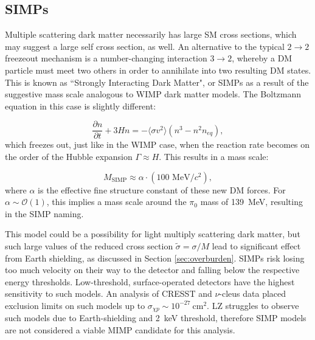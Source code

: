 \subsection{SIMPs}
\label{sec:simps}

Multiple scattering dark matter necessarily has large SM cross sections, which may suggest a large self cross section, as well.
An alternative to the typical $2\rightarrow 2$ freezeout mechanism is a number-changing interaction $3\rightarrow 2$, whereby a DM particle must meet two others in order to annihilate into two resulting DM states.
This is known as ``Strongly Interacting Dark Matter", or SIMPs\cite{bernal_wimp_2015, hochberg_simp_2022} as a result of the suggestive mass scale analogous to WIMP dark matter models.
The Boltzmann equation in this case is slightly different: 

\begin{equation}
    \frac{\partial n}{\partial t} + 3Hn = -\langle \sigma v^2\rangle (n^3 - n^2 n_{eq}),
    \label{eq:simp_boltzmann}
\end{equation}
\noindent
which freezes out, just like in the WIMP case, when the reaction rate becomes on the order of the Hubble expansion $\Gamma \approx H$.
This results in a mass scale\cite{hochberg_simp_2022}:

\begin{equation}
    M_{\text{SIMP}} \approx \alpha \cdot  (100 \text{~MeV} /c^2),
\end{equation}
\noindent
where $\alpha$ is the effective fine structure constant of these new DM forces.
For $\alpha \sim \mathcal{O}(1)$, this implies a mass scale around the $\pi_0$ mass of 139~MeV, resulting in the SIMP naming.

This model could be a possibility for light multiply scattering dark matter, but such large values of the reduced cross section $\tilde \sigma = \sigma/M$ lead to significant effect from Earth shielding\cite{albuquerque_direct_2003, kavanagh_earth-scattering_2018}, as discussed in Section \ref{sec:overburden}.
SIMPs  risk losing too much velocity on their way to the detector and falling below the respective energy thresholds.
Low-threshold, surface-operated detectors have the highest sensitivity to such models.
An analysis of CRESST and $\nu$-cleus data\cite{davis_probing_2017} placed exclusion limits on such models up to $\sigma_{\chi p} \sim 10^{-27} \mathrm{~cm}^2$.
LZ struggles to observe such models due to Earth-shielding and 2~keV threshold, therefore SIMP models are not considered a viable MIMP candidate for this analysis.

